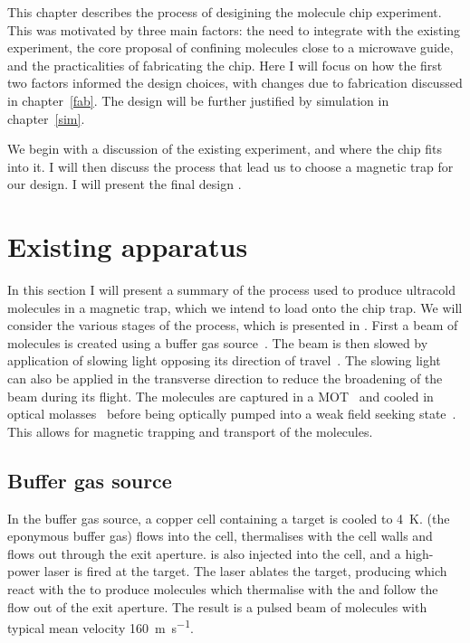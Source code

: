 This chapter describes the process of desigining the molecule chip experiment.
This was motivated by three main factors: the need to integrate with the
existing experiment, the core proposal of confining molecules close to a
microwave guide, and the practicalities of fabricating the chip. Here I will
focus on how the first two factors informed the design choices, with changes
due to fabrication discussed in chapter~\ref{fab}. The design will be further
justified by simulation in chapter~\ref{sim}.

We begin with a discussion of
the existing experiment, and where the chip fits into it. I will then discuss
the process that lead us to choose a magnetic trap for our design. I will
present the final design . 

\section{Existing \CaF{} apparatus}

In this section I will present a summary of the process used to produce
ultracold \CaF{} molecules in a magnetic trap, which we intend to load onto the
chip trap. We will consider the various stages of the process, which is
presented in . First a beam of \CaF{}
molecules is created using a buffer gas
source~\cite{doi:10.1080/09500340.2017.1384516}. The beam is then slowed by
application of slowing light opposing its direction of
travel~\cite{Truppe2017a}. The slowing light can also be applied in the
transverse direction to reduce the broadening of the beam during its flight.
The molecules are captured in a MOT~\cite{Williams2017} and cooled in optical
molasses~\cite{Truppe2017} before being optically pumped into a weak field
seeking state~\cite{WilliamsMagnetic2018}. This allows for magnetic trapping
and transport of the molecules.

\begin{figure}
  \caption{}
  \label{overview:fig:CaFcartoon}
\end{figure}

\subsection*{Buffer gas source}

In the buffer gas source, a copper cell containing a  target is
cooled to \SI{4}{\kelvin}.  (the eponymous buffer gas) flows into
the cell, thermalises with the cell walls and flows out through the exit
aperture.  is also injected into the cell, and a high-power 
laser is fired at the target. The laser ablates the  target,
producing  which react with the  to produce \CaF{}
molecules which thermalise with the  and follow the flow out of the
exit aperture.  The result is a pulsed beam of \CaF{} molecules with typical
mean velocity \SI{160}{\meter\per\second}.

